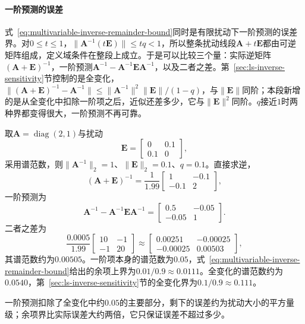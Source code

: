 \paragraph{一阶预测的误差}
式~\eqref{eq:multivariable-inverse-remainder-bound}同时是有限扰动下一阶预测的误差界。对$0\leq t\leq1$，$\lVert\bm A^{-1}(t\bm E)\rVert\leq tq<1$，所以整条扰动线段$\bm A+t\bm E$都由可逆矩阵组成，定义域条件在整段上成立。于是可以比较三个量：实际逆矩阵$(\bm A+\bm E)^{-1}$，一阶预测$\bm A^{-1}-\bm A^{-1}\bm E\bm A^{-1}$，以及二者之差。第~\ref{sec:ls-inverse-sensitivity}节控制的是全变化，$\lVert(\bm A+\bm E)^{-1}-\bm A^{-1}\rVert\leq\lVert\bm A^{-1}\rVert^2\lVert\bm E\rVert/(1-q)$，与$\lVert\bm E\rVert$同阶；本段新增的是从全变化中扣除一阶项之后，近似还差多少，它与$\lVert\bm E\rVert^2$同阶。$q$接近$1$时两种界都变得很大，一阶预测不再可靠。
\begin{example}[逆矩阵的一阶预测与余项]
\label{ex:multivariable-inverse-first-order-check}
取$\bm A=\operatorname{diag}(2,1)$与扰动
\[
 \bm E=\begin{bmatrix}0&0.1\\0.1&0\end{bmatrix},
\]
采用谱范数，则$\lVert\bm A^{-1}\rVert_2=1$、$\lVert\bm E\rVert_2=0.1$、$q=0.1$。直接求逆，
\[
 (\bm A+\bm E)^{-1}=\frac1{1.99}\begin{bmatrix}1&-0.1\\-0.1&2\end{bmatrix},
\]
一阶预测为
\[
 \bm A^{-1}-\bm A^{-1}\bm E\bm A^{-1}=\begin{bmatrix}0.5&-0.05\\-0.05&1\end{bmatrix}.
\]
二者之差为
\[
 \frac{0.0005}{1.99}\begin{bmatrix}10&-1\\-1&20\end{bmatrix}\approx\begin{bmatrix}0.00251&-0.00025\\-0.00025&0.00503\end{bmatrix},
\]
其谱范数约为$0.00505$。一阶项本身的谱范数为$0.05$，式~\eqref{eq:multivariable-inverse-remainder-bound}给出的余项上界为$0.01/0.9\approx0.0111$。全变化的谱范数约为$0.0540$，第~\ref{sec:ls-inverse-sensitivity}节的全变化界为$0.1/0.9\approx0.111$。
\end{example}
一阶预测扣除了全变化中约$0.05$的主要部分，剩下的误差约为扰动大小的平方量级；余项界比实际误差大约两倍，它只保证误差不超过多少。

